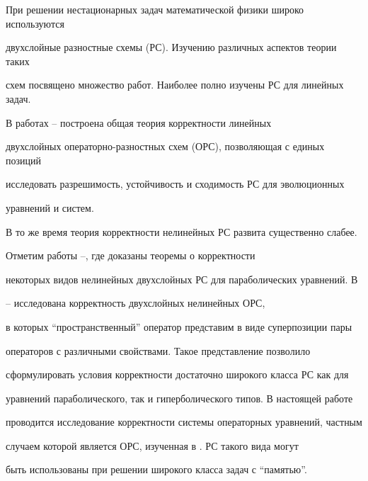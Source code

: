 \pagestyle{plain} 


 


 


\maketitle 


 


При решении нестационарных задач математической физики широко используются 


двухслойные разностные схемы (РС). Изучению различных аспектов теории таких 


схем посвящено множество работ. Наиболее полно изучены РС для линейных задач. 


В работах \cite{Sa1}--\cite{Gul} построена общая теория корректности линейных 


двухслойных операторно-разностных схем (ОРС), позволяющая с единых позиций 


исследовать разрешимость, устойчивость и сходимость РС для эволюционных 


уравнений и систем. 


 


В то же время теория корректности нелинейных РС развита существенно слабее. 


Отметим работы \cite{L1}--\cite{Fed1}, где доказаны теоремы о корректности 


некоторых видов нелинейных двухслойных РС для параболических уравнений. В 


\cite{Fed2}--\cite{Fed3} исследована корректность двухслойных нелинейных ОРС, 


в которых ``пространственный'' оператор представим в виде суперпозиции пары 


операторов с различными свойствами. Такое представление позволило 


сформулировать условия корректности достаточно широкого класса РС как для 


уравнений параболического, так и гиперболического типов. В настоящей работе 


проводится исследование корректности системы операторных уравнений, частным 


случаем которой является ОРС, изученная в \cite{Fed2}. РС такого вида могут 


быть использованы при решении широкого класса задач с ``памятью''. 


